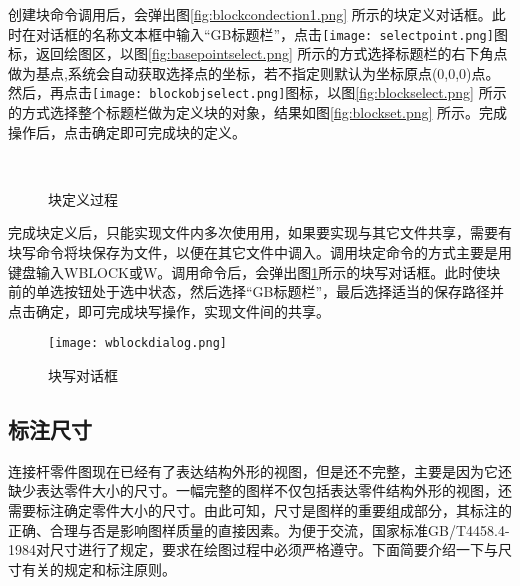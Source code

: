 \begin{procedure}
创建块命令调用后，会弹出图\ref{fig:blockcondection1.png} 所示的块定义对话框。此时在对话框的名称文本框中输入“GB标题栏”，点击\texttt{[image: selectpoint.png]}图标，返回绘图区，以图\ref{fig:basepointselect.png} 所示的方式选择标题栏的右下角点做为基点,系统会自动获取选择点的坐标，若不指定则默认为坐标原点(0,0,0)点。然后，再点击\texttt{[image: blockobjselect.png]}图标，以图\ref{fig:blockselect.png} 所示的方式选择整个标题栏做为定义块的对象，结果如图\ref{fig:blockset.png} 所示。完成操作后，点击确定即可完成块的定义。
\begin{figure}[htbp]
\centering
{}\hspace{20pt}
\hspace{20pt}\\
\hspace{20pt}
\caption{块定义过程}
\end{figure}

完成块定义后，只能实现文件内多次使用用，如果要实现与其它文件共享，需要有块写命令将块保存为文件，以便在其它文件中调入。调用块定命令的方式主要是用键盘输入WBLOCK或W。调用命令后，会弹出图\ref{fig:wblockdialog.png}所示的块写对话框。此时使块前的单选按钮处于选中状态，然后选择“GB标题栏”，最后选择适当的保存路径并点击确定，即可完成块写操作，实现文件间的共享。
\begin{figure}[htbp]
\centering
\texttt{[image: wblockdialog.png]}
\caption{块写对话框}\label{fig:wblockdialog.png}
\end{figure}
\end{procedure}
\subsection{标注尺寸}

连接杆零件图现在已经有了表达结构外形的视图，但是还不完整，主要是因为它还缺少表达零件大小的尺寸。一幅完整的图样不仅包括表达零件结构外形的视图，还需要标注确定零件大小的尺寸。由此可知，尺寸是图样的重要组成部分，其标注的正确、合理与否是影响图样质量的直接因素。为便于交流，国家标准GB/T4458.4-1984对尺寸进行了规定，要求在绘图过程中必须严格遵守。下面简要介绍一下与尺寸有关的规定和标注原则。

